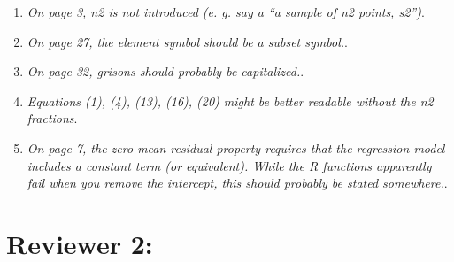 \documentclass{article}
\begin{document}
\begin{enumerate}
	
	\item \textit{On page 3, n2 is not introduced (e. g. say a “a sample of n2 points, s2”)}.
	
	
	\item \textit{On page 27, the element symbol should be a subset symbol.}.
	
	
	\item \textit{On page 32, grisons should probably be capitalized.}.
	
	
	\item \textit{Equations (1), (4), (13), (16), (20) might be better readable without the n2 fractions}.
	
	
	\item \textit{On page 7, the zero mean residual property requires that the regression model includes a constant term (or equivalent). While the R functions apparently fail when you remove the intercept, this should probably be stated somewhere.}.
	
	
\end{enumerate} 



\section*{Reviewer 2:}
\end{document}
